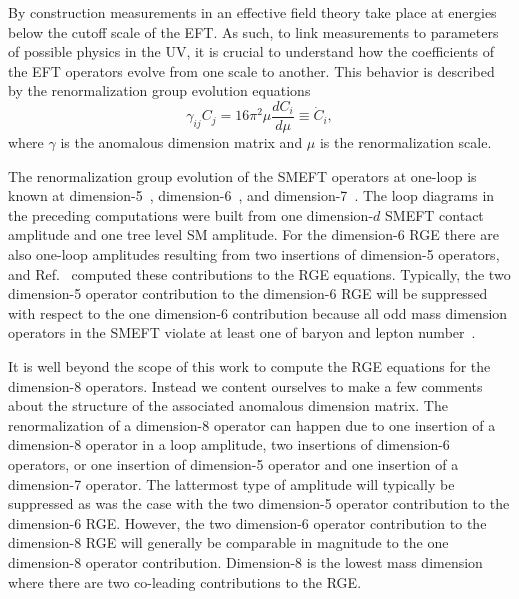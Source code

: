 By construction measurements in an effective field theory take place at energies below the cutoff scale of the EFT.
As such, to link measurements to parameters of possible physics in the UV, it is crucial to understand how the coefficients of the EFT operators evolve from one scale to another.
This behavior is described by the renormalization group evolution equations
\begin{equation}
\gamma_{ij} C_j = 16 \pi^2 \mu \frac{d C_i}{d \mu} \equiv \dot C_i ,
\end{equation}
where $\gamma$ is the anomalous dimension matrix and $\mu$ is the renormalization scale.

The renormalization group evolution of the SMEFT operators at one-loop is known at dimension-5~\cite{Babu:1993qv}, dimension-6~\cite{Jenkins:2013zja, Jenkins:2013wua, Alonso:2013hga, Alonso:2014zka}, and dimension-7~\cite{Liao:2016hru, Liao:2019tep}.
The loop diagrams in the preceding computations were built from one dimension-$d$ SMEFT contact amplitude and one tree level SM amplitude.
For the dimension-6 RGE there are also one-loop amplitudes resulting from two insertions of dimension-5 operators, and Ref.~\cite{Davidson:2018zuo} computed these contributions to the RGE equations.
Typically, the two dimension-5 operator contribution to the dimension-6 RGE will be suppressed with respect to the one dimension-6 contribution because all odd mass dimension operators in the SMEFT violate at least one of baryon and lepton number~\cite{Kobach:2016ami, Helset:2019eyc}.

It is well beyond the scope of this work to compute the RGE equations for the dimension-8 operators.
Instead we content ourselves to make a few comments about the structure of the associated anomalous dimension matrix. 
The renormalization of a dimension-8 operator can happen due to one insertion of a dimension-8 operator in a loop amplitude, two insertions of dimension-6 operators, or one insertion of dimension-5 operator and one insertion of a dimension-7 operator.
The lattermost type of amplitude will typically be suppressed as was the case with the two dimension-5 operator contribution to the dimension-6 RGE.
However, the two dimension-6 operator contribution to the dimension-8 RGE will generally be comparable in magnitude to the one dimension-8 operator contribution.
Dimension-8 is the lowest mass dimension where there are two co-leading contributions to the RGE.

